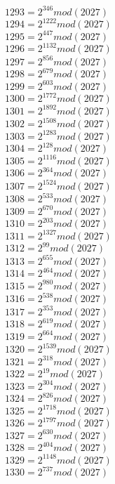 \documentclass[12pt, letterpaper]{article}
\begin{document}
\begin{itemize}
\begin{multicols}{3}
$1293= 2^{346} mod (2027)$\\
$1294= 2^{1222} mod (2027)$\\
$1295= 2^{447} mod (2027)$\\
$1296= 2^{1132} mod (2027)$\\
$1297= 2^{856} mod (2027)$\\
$1298= 2^{679} mod (2027)$\\
$1299= 2^{603} mod (2027)$\\
$1300= 2^{1772} mod (2027)$\\
$1301= 2^{1892} mod (2027)$\\
$1302= 2^{1508} mod (2027)$\\
$1303= 2^{1283} mod (2027)$\\
$1304= 2^{128} mod (2027)$\\
$1305= 2^{1116} mod (2027)$\\
$1306= 2^{364} mod (2027)$\\
$1307= 2^{1524} mod (2027)$\\
$1308= 2^{533} mod (2027)$\\
$1309= 2^{670} mod (2027)$\\
$1310= 2^{203} mod (2027)$\\
$1311= 2^{1327} mod (2027)$\\
$1312= 2^{99} mod (2027)$\\
$1313= 2^{655} mod (2027)$\\
$1314= 2^{464} mod (2027)$\\
$1315= 2^{980} mod (2027)$\\
$1316= 2^{538} mod (2027)$\\
$1317= 2^{353} mod (2027)$\\
$1318= 2^{619} mod (2027)$\\
$1319= 2^{664} mod (2027)$\\
$1320= 2^{1539} mod (2027)$\\
$1321= 2^{318} mod (2027)$\\
$1322= 2^{19} mod (2027)$\\
$1323= 2^{304} mod (2027)$\\
$1324= 2^{826} mod (2027)$\\
$1325= 2^{1718} mod (2027)$\\
$1326= 2^{1797} mod (2027)$\\
$1327= 2^{630} mod (2027)$\\
$1328= 2^{404} mod (2027)$\\
$1329= 2^{1148} mod (2027)$\\
$1330= 2^{737} mod (2027)$\\

\end{multicols}
\end{itemize}
\end{document}
